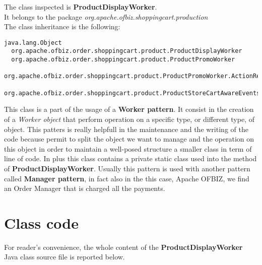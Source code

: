 The class inspected is \textbf{ProductDisplayWorker}.\\
It belongs to the package \textit{org.apache.ofbiz.shoppingcart.production}\\
The class inheritance is the following:
\begin{verbatim}
java.lang.Object
  org.apache.ofbiz.order.shoppingcart.product.ProductDisplayWorker
  org.apache.ofbiz.order.shoppingcart.product.ProductPromoWorker
  org.apache.ofbiz.order.shoppingcart.product.ProductPromoWorker.ActionResultInfo
  org.apache.ofbiz.order.shoppingcart.product.ProductStoreCartAwareEvents
\end{verbatim}

This class is a part of the usage of a \textbf{Worker pattern}.
It consist in the creation of a \textit{Worker object} that perform operation on a
specific type, or different type, of object.
This patters is really helpfull in the maintenance and the writing of the code
because permit to split the object we want to manage and the operation on this
object in order to maintain a well-posed structure a smaller class in term of line of code.
In plus this class contains a private static class used into the method of \textbf{ProductDisplayWorker}.
Usually this pattern is used with another pattern called \textbf{Manager pattern}, in fact also in the this case, Apache OFBIZ, we find an Order Manager that
is charged all the payments.

\section{Class code}
For reader's convenience, the whole content of the \textbf{ProductDisplayWorker} Java class source file is reported below.

